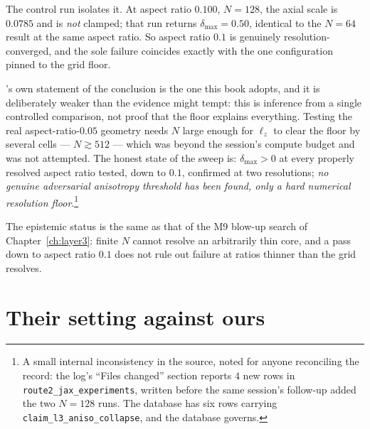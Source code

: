 The control run isolates it. At aspect ratio \(0.100\), \(N=128\), the axial
scale is \(0.0785\) and is \emph{not} clamped; that run returns
\(\delta_{\max}=0.50\), identical to the \(N=64\) result at the same aspect
ratio. So aspect ratio \(0.1\) is genuinely resolution-converged, and the sole
failure coincides exactly with the one configuration pinned to the grid floor.

's own statement of the conclusion is the one this book adopts, and it
is deliberately weaker than the evidence might tempt: this is inference from a
single controlled comparison, not proof that the floor explains everything.
Testing the real aspect-ratio-\(0.05\) geometry needs \(N\) large enough for
\(\ell_z\) to clear the floor by several cells --- \(N\gtrsim512\) --- which was
beyond the session's compute budget and was not attempted. The honest state of
the sweep is: \(\delta_{\max}>0\) at every properly resolved aspect ratio
tested, down to \(0.1\), confirmed at two resolutions; \emph{no genuine
adversarial anisotropy threshold has been found, only a hard numerical
resolution floor}.\footnote{A small internal inconsistency in the source, noted
for anyone reconciling the record: the  log's ``Files changed'' section
reports \(4\) new rows in \texttt{route2\_jax\_experiments}, written before the
same session's follow-up added the two \(N=128\) runs. The database has six
rows carrying \texttt{claim\_l3\_aniso\_collapse}, and the database governs.}

The epistemic status is the same as that of the M9 blow-up search of
Chapter~\ref{ch:layer3}: finite \(N\) cannot resolve an arbitrarily thin core,
and a pass down to aspect ratio \(0.1\) does not rule out failure at ratios
thinner than the grid resolves.

\section{Their setting against ours}
\label{sec:comparison}


